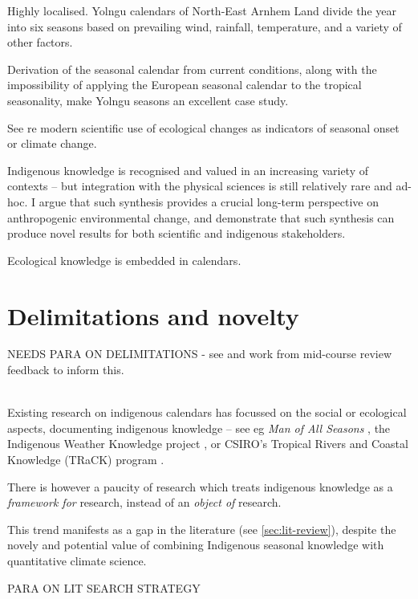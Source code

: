Highly localised.
Yolngu calendars of North-East Arnhem Land divide the year into
six seasons based on prevailing wind, rainfall, temperature,
and a variety of other factors.

Derivation of the seasonal calendar from current conditions,
along with the impossibility of applying the European seasonal calendar
to the tropical seasonality, make Yolngu seasons an excellent case study.

See \citet{menzel2006} re modern scientific use of ecological changes
as indicators of seasonal onset or climate change.



Indigenous knowledge is recognised and valued in an increasing variety
of contexts \citep[eg.][]{petheram2011,cochran2015,berkes2008} –
but integration with the physical sciences is still relatively rare and ad-hoc.
%
I argue that such synthesis provides a crucial long-term perspective on
anthropogenic environmental change, and demonstrate that such synthesis
can produce novel results for both scientific and indigenous stakeholders.

Ecological knowledge is embedded in calendars.



\section{Delimitations and novelty}

NEEDS PARA ON DELIMITATIONS - see and work from mid-course review feedback to inform this.

~\\

Existing research on indigenous calendars has focussed on the social or ecological aspects,
documenting indigenous knowledge – see eg \textit{Man of All Seasons} \citep{davis1989},
the Indigenous Weather Knowledge project \citet{BOM-iwk},
or CSIRO’s Tropical Rivers and Coastal Knowledge (TRaCK) program \citep{CSIROcals,oconnor2010}.

There is however a paucity of research which treats indigenous knowledge
as a \emph{framework for} research, instead of an \emph{object of} research.

This trend manifests as a gap in the literature (see \autoref{sec:lit-review}),
despite the novely and potential value of combining Indigenous seasonal knowledge
with quantitative climate science.

PARA ON LIT SEARCH STRATEGY


